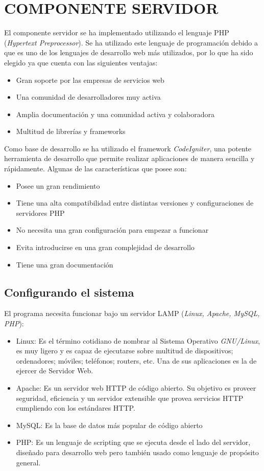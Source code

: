 \section{COMPONENTE SERVIDOR}

El componente servidor se ha implementado utilizando el lenguaje PHP (\emph{Hypertext Preprocessor}). Se ha utilizado este lenguaje de programación debido a que es uno de los lenguajes de desarrollo web más utilizados, por lo que ha sido elegido ya que cuenta con las siguientes ventajas:

	\begin{itemize}
		\item Gran soporte por las empresas de servicios web
		\item Una comunidad de desarrolladores muy activa
		\item Amplia documentación y una comunidad activa y colaboradora
		\item Multitud de librerías y frameworks
	\end{itemize}

Como base de desarrollo se ha utilizado el framework \emph{CodeIgniter}, una potente herramienta de desarrollo que permite realizar aplicaciones de manera sencilla y rápidamente. Algunas de las características que posee son:

	\begin{itemize}
		\item Posee un gran rendimiento
		\item Tiene una alta compatibilidad entre distintas versiones y configuraciones de servidores PHP
		\item No necesita una gran configuración para empezar a funcionar
		\item Evita introducirse en una gran complejidad de desarrollo
		\item Tiene una gran documentación
	\end{itemize}

\subsection{Configurando el sistema}

El programa necesita funcionar bajo un servidor LAMP (\emph{Linux, Apache, MySQL, PHP}):

	\begin{itemize}
		\item Linux: Es el término cotidiano de nombrar al Sistema Operativo \emph{GNU/Linux}, es muy ligero y es capaz de ejecutarse sobre multitud de dispositivos; ordenadores; móviles; teléfonos; routers, etc. Una de sus aplicaciones es la de ejercer de Servidor Web. 
		\item Apache: Es un servidor web HTTP de código abierto. Su objetivo es proveer seguridad, eficiencia y un servidor extensible que provea servicios HTTP cumpliendo con los estándares HTTP.
		\item MySQL: Es la base de datos más popular de código abierto
		\item PHP: Es un lenguaje de scripting que se ejecuta desde el lado del servidor, diseñado para desarrollo web pero también usado como lenguaje de propósito general.
	\end{itemize}

